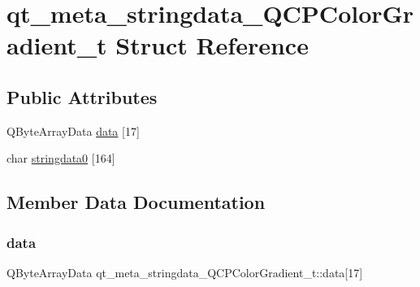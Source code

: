 \hypertarget{structqt__meta__stringdata___q_c_p_color_gradient__t}{}\section{qt\+\_\+meta\+\_\+stringdata\+\_\+\+Q\+C\+P\+Color\+Gradient\+\_\+t Struct Reference}
\label{structqt__meta__stringdata___q_c_p_color_gradient__t}
\subsection*{Public Attributes}
\begin{DoxyCompactItemize}
\item 
Q\+Byte\+Array\+Data \mbox{\hyperlink{structqt__meta__stringdata___q_c_p_color_gradient__t_a4b1142eed666e972a34a24fbcd9338e7}{data}} \mbox{[}17\mbox{]}
\item 
char \mbox{\hyperlink{structqt__meta__stringdata___q_c_p_color_gradient__t_af6991165899703d0e9df570ab79718c3}{stringdata0}} \mbox{[}164\mbox{]}
\end{DoxyCompactItemize}


\subsection{Member Data Documentation}
\mbox{\label{structqt__meta__stringdata___q_c_p_color_gradient__t_a4b1142eed666e972a34a24fbcd9338e7}} 
\subsubsection{\texorpdfstring{data}{data}}
{\footnotesize\ttfamily Q\+Byte\+Array\+Data qt\+\_\+meta\+\_\+stringdata\+\_\+\+Q\+C\+P\+Color\+Gradient\+\_\+t\+::data\mbox{[}17\mbox{]}}

\mbox{\label{structqt__meta__stringdata___q_c_p_color_gradient__t_af6991165899703d0e9df570ab79718c3}} 
